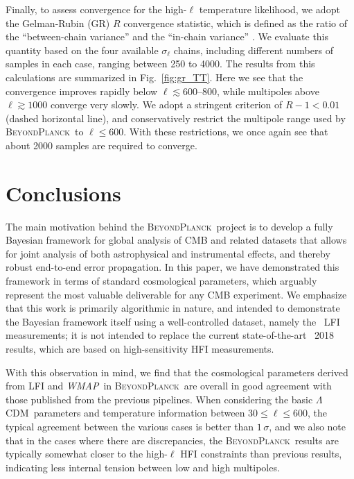 \documentclass[twocolumn]{aa}
\def\WMAP{\textit{WMAP}}
\def\LCDM{$\Lambda$CDM}
\newcommand{\BP}{\textsc{BeyondPlanck}}
\begin{document}
Finally, to assess convergence for the high-$\ell$ temperature
likelihood, we adopt the Gelman-Rubin (GR) $R$ convergence statistic,
which is defined as the ratio of the ``between-chain variance'' and
the ``in-chain variance'' \citep{gelman:1992}. We evaluate this
quantity based on the four available $\sigma_{\ell}$ chains, including
different numbers of samples in each case, ranging between 250 to
4000. The results from this calculations are summarized in
Fig.~\ref{fig:gr_TT}. Here we see that the convergence improves
rapidly below $\ell\lesssim600$--800, while multipoles above
$\ell\gtrsim 1000$ converge very slowly. We adopt a stringent
criterion of $R-1 < 0.01$ (dashed horizontal line), and conservatively
restrict the multipole range used by \BP\ to $\ell\le600$. With these
restrictions, we once again see that about 2000 samples are required
to converge.

\section{Conclusions}
\label{sec:conclusions}

The main motivation behind the \BP\ project is to develop a fully
Bayesian framework for global analysis of CMB and related datasets
that allows for joint analysis of both astrophysical and instrumental
effects, and thereby robust end-to-end error propagation. In this
paper, we have demonstrated this framework in terms of standard
cosmological parameters, which arguably represent the most valuable
deliverable for any CMB experiment. We emphasize that this work is
primarily algorithmic in nature, and intended to demonstrate the
Bayesian framework itself using a well-controlled dataset, namely the
\Planck\ LFI measurements; it is not intended to replace the current
state-of-the-art \Planck\ 2018 results, which are based on
high-sensitivity HFI measurements.

With this observation in mind, we find that the cosmological
parameters derived from LFI and \WMAP\ in \BP\ are overall in good
agreement with those published from the previous pipelines. When
considering the basic \LCDM\ parameters and temperature information
between $30\le\ell\le600$, the typical agreement between the various
cases is better than $1\,\sigma$, and we also note that in the cases
where there are discrepancies, the \BP\ results are typically somewhat
closer to the high-$\ell$ HFI constraints than previous results,
indicating less internal tension between low and high multipoles.
\end{document}
